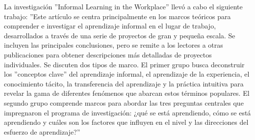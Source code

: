 La investigación ''Informal Learning in the Workplace'' llevó a cabo el siguiente
trabajo:
''Este artículo se centra principalmente en los marcos teóricos para comprender e
investigar el aprendizaje informal en el lugar de trabajo, desarrollados a
través de una serie de proyectos de gran y pequeña escala. Se incluyen las
principales conclusiones, pero se remite a los lectores a otras publicaciones
para obtener descripciones más detalladas de proyectos individuales. Se discuten
dos tipos de marco. El primer grupo busca deconstruir los ''conceptos clave'' del
aprendizaje informal, el aprendizaje de la experiencia, el conocimiento tácito,
la transferencia del aprendizaje y la práctica intuitiva para revelar la gama de
diferentes fenómenos que abarcan estos términos populares. El segundo grupo
comprende marcos para abordar las tres preguntas centrales que impregnaron el
programa de investigación: ¿qué se está aprendiendo, cómo se está aprendiendo y
cuáles son los factores que influyen en el nivel y las direcciones del esfuerzo
de aprendizaje?''
\cite{article:informal_learning_eraut}